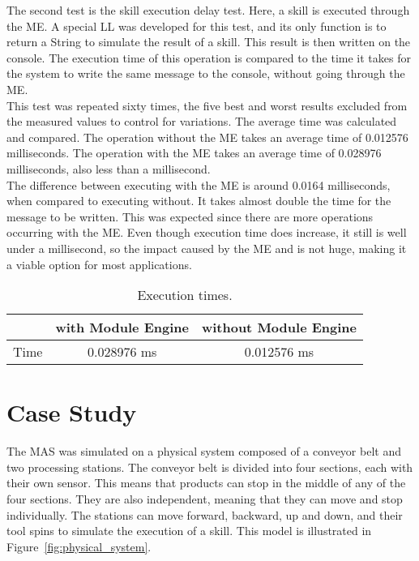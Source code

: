 The second test is the skill execution delay test. Here, a skill is executed through the \acrlong{ME}. A special \acrlong{LL} was developed for this test, and its only function is to return a String to simulate the result of a skill. This result is then written on the console. The execution time of this operation is compared to the time it takes for the system to write the same message to the console, without going through the \acrshort{ME}.\\

This test was repeated sixty times, the five best and worst results excluded from the measured values to control for variations. The average time was calculated and compared. The operation without the \acrshort{ME} takes an average time of 0.012576 milliseconds. The operation with the \acrshort{ME} takes an average time of 0.028976 milliseconds, also less than a millisecond.\\

The difference between executing with the \acrshort{ME} is around 0.0164 milliseconds, when compared to executing without. It takes almost double the time for the message to be written. This was expected since there are more operations occurring with the \acrshort{ME}. Even though execution time does increase, it still is well under a millisecond, so the impact caused by the \acrlong{ME} and  is not huge, making it a viable option for most applications.

\begin{table}[h!]
	\centering
	\caption{Execution times.}
	\begin{tabular}{l|c|c|}
		\cline{2-3}
									& with Module Engine & without Module Engine \\ \hline
		\multicolumn{1}{|l|}{Time} 	& 0.028976 ms           & 0.012576 ms              \\ \hline
	\end{tabular}
	\label{tab:execution_times}
\end{table}

\section{Case Study}

The \acrshort{MAS} was simulated on a physical system composed of a conveyor belt and two processing stations. The conveyor belt is divided into four sections, each with their own sensor. This means that products can stop in the middle of any of the four sections. They are also independent, meaning that they can move and stop individually. The stations can move forward, backward, up and down, and their tool spins to simulate the execution of a skill. This model is illustrated in Figure~\ref{fig:physical_system}.


